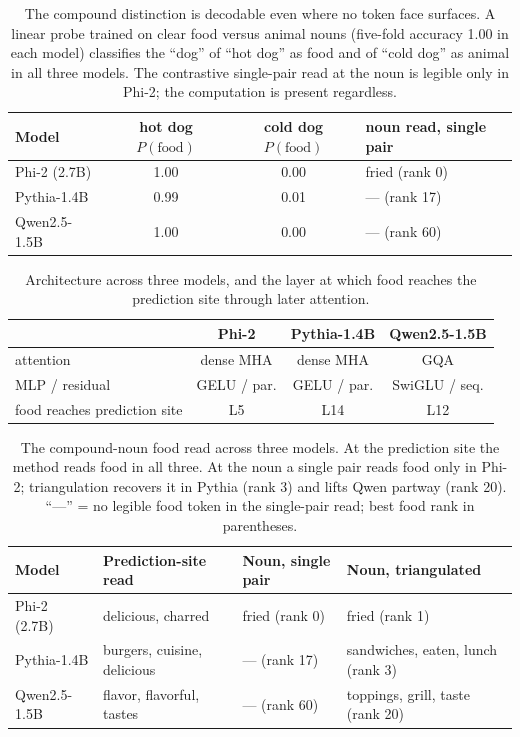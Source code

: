 \documentclass[11pt]{article}
\begin{document}
\begin{table}[htbp]
\centering
\small
\begin{tabular}{@{}lccl@{}}
\toprule
Model & hot dog $P(\text{food})$ & cold dog $P(\text{food})$ & noun read, single pair \\
\midrule
Phi-2 (2.7B)  & 1.00 & 0.00 & fried (rank 0) \\
Pythia-1.4B   & 0.99 & 0.01 & --- (rank 17) \\
Qwen2.5-1.5B  & 1.00 & 0.00 & --- (rank 60) \\
\bottomrule
\end{tabular}
\caption{The compound distinction is decodable even where no token face
surfaces. A linear probe trained on clear food versus animal nouns (five-fold
accuracy 1.00 in each model) classifies the ``dog'' of ``hot dog'' as food and
of ``cold dog'' as animal in all three models. The contrastive single-pair read
at the noun is legible only in Phi-2; the computation is present regardless.}
\label{tab:crossmodel-probe}
\end{table}

\begin{table}[htbp]
\centering
\small
\begin{tabular}{lccc}
\toprule
 & Phi-2 & Pythia-1.4B & Qwen2.5-1.5B \\
\midrule
attention & dense MHA & dense MHA & GQA \\
MLP / residual & GELU / par. & GELU / par. & SwiGLU / seq. \\
\midrule
food reaches prediction site & L5 & L14 & L12 \\
\bottomrule
\end{tabular}
\caption{Architecture across three models, and the layer at which food reaches
the prediction site through later attention.}
\label{tab:crossmodel}
\end{table}

\begin{table}[htbp]
\centering
\small
\begin{tabularx}{\columnwidth}{@{}lYYY@{}}
\toprule
Model & Prediction-site read & Noun, single pair & Noun, triangulated \\
\midrule
Phi-2 (2.7B) & delicious, charred          & fried (rank 0) & fried (rank 1) \\
Pythia-1.4B  & burgers, cuisine, delicious & --- (rank 17)  & sandwiches, eaten, lunch (rank 3) \\
Qwen2.5-1.5B & flavor, flavorful, tastes   & --- (rank 60)  & toppings, grill, taste (rank 20) \\
\bottomrule
\end{tabularx}
\caption{The compound-noun food read across three models. At the prediction site
the method reads food in all three. At the noun a single pair reads food only in
Phi-2; triangulation recovers it in Pythia (rank 3) and lifts Qwen partway (rank
20). ``---'' = no legible food token in the single-pair read; best food rank in
parentheses.}
\label{tab:crossmodel-reads}
\end{table}
\end{document}
